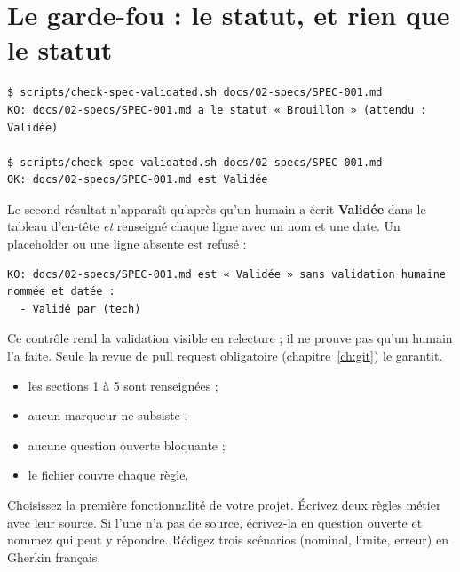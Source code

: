 \section{Le garde-fou : le statut, et rien que le statut}
\begin{code}
\begin{Verbatim}
$ scripts/check-spec-validated.sh docs/02-specs/SPEC-001.md
KO: docs/02-specs/SPEC-001.md a le statut « Brouillon » (attendu : Validée)

$ scripts/check-spec-validated.sh docs/02-specs/SPEC-001.md
OK: docs/02-specs/SPEC-001.md est Validée
\end{Verbatim}
\end{code}
Le second résultat n'apparaît qu'après qu'un humain a écrit \textbf{Validée} dans le tableau d'en-tête \emph{et} renseigné chaque ligne  avec un nom et une date. Un placeholder  ou une ligne absente est refusé :
\begin{code}
\begin{Verbatim}
KO: docs/02-specs/SPEC-001.md est « Validée » sans validation humaine nommée et datée :
  - Validé par (tech)
\end{Verbatim}
\end{code}
Ce contrôle rend la validation visible en relecture ; il ne prouve pas qu'un humain l'a faite. Seule la revue de pull request obligatoire (chapitre~\ref{ch:git}) le garantit.

\begin{retenir}
\begin{itemize}
  \item les sections 1 à 5 sont renseignées ;
  \item aucun marqueur \cmd{[...]} ne subsiste ;
  \item aucune question ouverte bloquante ;
  \item le fichier  couvre chaque règle.
\end{itemize}
\end{retenir}

\begin{vousjouez}
Choisissez la première fonctionnalité de votre projet. Écrivez deux règles métier avec leur source. Si l'une n'a pas de source,
écrivez-la en question ouverte et nommez qui peut y répondre. Rédigez trois scénarios (nominal, limite, erreur) en Gherkin français.
\end{vousjouez}

